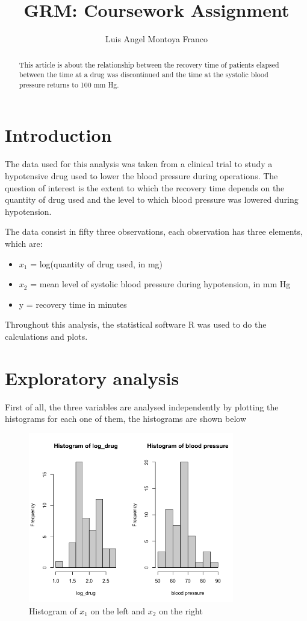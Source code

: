 \documentclass{article}
\title{\LARGE GRM: Coursework Assignment}
\author{Luis Angel Montoya Franco}
\begin{document}
\maketitle

\begin{abstract}
This article is about the relationship between the recovery time of patients elapsed between the time at a drug was discontinued and the time at the systolic blood pressure returns to 100 mm Hg.
\end{abstract}

\section{Introduction}

The data used for this analysis was taken from a clinical trial to study a hypotensive drug used to lower the blood pressure during operations. The question of interest is the extent to which the recovery time depends on the quantity of drug used and the level to which blood pressure was lowered during hypotension. 

The data consist in fifty three observations, each observation has three elements, which are:
\begin{itemize}
    \item \(x_1\) = log(quantity of drug used, in mg)
    \item \(x_2\) =  mean level of systolic blood pressure during hypotension, in mm Hg
    \item y = recovery time in minutes
\end{itemize}
Throughout  this analysis, the statistical software R was used to do the calculations and plots. 
\section{Exploratory analysis}

First of all, the three variables are analysed independently by plotting the histograms for each one of them, the histograms are shown below


\begin{figure}[H]
\centering
\includegraphics[width=0.8\textwidth]{hx1x2.png}
\caption{\label{fig:frog} Histogram of $x_1$ on the left and $x_2$ on the right}
\end{figure}
\end{document}
